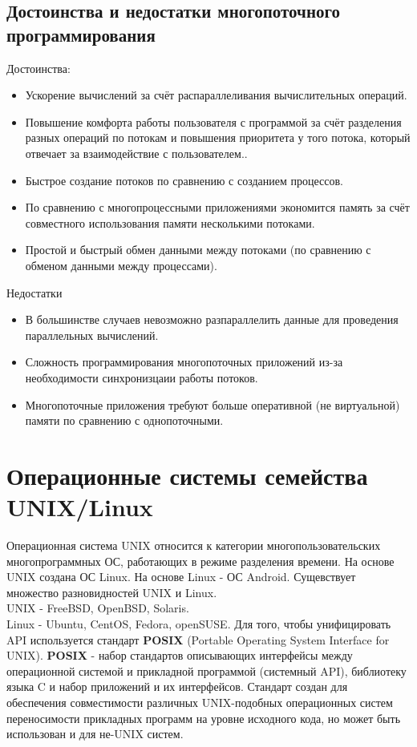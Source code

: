 \documentclass[a4paper]{article}
\begin{document}
\subsection{Достоинства и недостатки многопоточного программирования}
Достоинства:
\begin{itemize}
        \item Ускорение вычислений за счёт распараллеливания вычислительных операций.
	\item Повышение комфорта работы пользователя с программой за счёт разделения разных операций по потокам и повышения приоритета у того потока, который отвечает за взаимодействие с пользователем..
	\item Быстрое создание потоков по сравнению с созданием процессов.
	\item По сравнению с многопроцессными приложениями экономится память за счёт совместного использования памяти несколькими потоками.
	\item Простой и быстрый обмен данными между потоками (по сравнению с обменом данными между процессами).
\end{itemize}
Недостатки
\begin{itemize}
        \item В большинстве случаев невозможно разпараллелить данные для проведения параллельных вычислений.
	\item Сложность программирования многопоточных приложений из-за необходимости синхронизцаии работы потоков.
	\item Многопоточные приложения требуют больше оперативной (не виртуальной) памяти по сравнению с однопоточными.
\end{itemize}
\section{Операционные системы семейства UNIX/Linux}
\setcounter{subsection}{0}
Операционная система UNIX относится к категории многопользовательских многопрограммных ОС, работающих в режиме разделения времени. На основе UNIX создана ОС Linux. На основе Linux - ОС Android. Сущевствует множество разновидностей UNIX и Linux.\\
UNIX - FreeBSD, OpenBSD, Solaris.\\
Linux - Ubuntu, CentOS, Fedora, openSUSE.
Для того, чтобы унифицировать API используется стандарт \textbf{POSIX} (Portable Operating System Interface for UNIX).
\textbf{POSIX} - набор стандартов описывающих интерфейсы между операционной системой и прикладной программой (системный API), библиотеку языка C и набор приложений и их интерфейсов. Стандарт создан для обеспечения совместимости различных UNIX-подобных операционных систем переносимости прикладных программ на уровне исходного кода, но может быть использован и для не-UNIX систем. 
\end{document}
